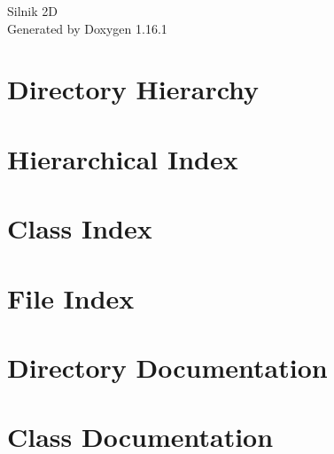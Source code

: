 \documentclass[twoside]{book}
\newcommand{\+}{\discretionary{\mbox{\scriptsize$\hookleftarrow$}}{}{}}
\newcommand{\clearemptydoublepage}{%
    \newpage{\pagestyle{empty}\cleardoublepage}%
  }
\begin{document}
  \raggedbottom
    \hypersetup{pageanchor=false,
                bookmarksnumbered=true,
                pdfencoding=unicode
               }
  \begin{titlepage}
  \vspace*{7cm}
  \begin{center}%
  {\Large Silnik 2D}\\
  \vspace*{1cm}
  {\large Generated by Doxygen 1.16.1}\\
  \end{center}
  \end{titlepage}
  \clearemptydoublepage
  \tableofcontents
  \clearemptydoublepage
  \hypersetup{pageanchor=true}
\chapter{Directory Hierarchy}

\chapter{Hierarchical Index}

\chapter{Class Index}

\chapter{File Index}

\chapter{Directory Documentation}


\chapter{Class Documentation}


















\end{document}
